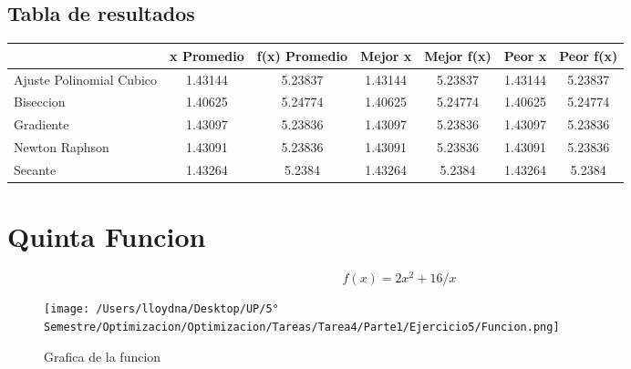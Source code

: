 \documentclass{report}
\begin{document}
            \subsection{Tabla de resultados}
            \begin{tabular}{l|c|c|c|c|c|c}
                & x Promedio & f(x) Promedio & Mejor x & Mejor f(x) & Peor x & Peor f(x)\\
                \hline
                Ajuste Polinomial Cubico & 1.43144 & 5.23837 & 1.43144 & 5.23837 & 1.43144 & 5.23837\\
                \hline
                Biseccion & 1.40625 & 5.24774 & 1.40625 & 5.24774 & 1.40625 & 5.24774\\
                \hline
                Gradiente & 1.43097 & 5.23836 & 1.43097 & 5.23836 & 1.43097 & 5.23836\\
                \hline
                Newton Raphson & 1.43091 & 5.23836 & 1.43091 & 5.23836 & 1.43091 & 5.23836\\
                \hline
                Secante & 1.43264 & 5.2384 & 1.43264 & 5.2384 & 1.43264 & 5.2384\\
                \hline
            \end{tabular}
        \pagebreak

        \section{Quinta Funcion}
            \begin{equation*}
                f(x)=2x^2+16/x
            \end{equation*}

            \begin{figure}[H]
                \texttt{[image: /Users/lloydna/Desktop/UP/5° Semestre/Optimizacion/Optimizacion/Tareas/Tarea4/Parte1/Ejercicio5/Funcion.png]}
                \caption{Grafica de la funcion}
                \label{fig:fun15}
            \end{figure}
\end{document}
